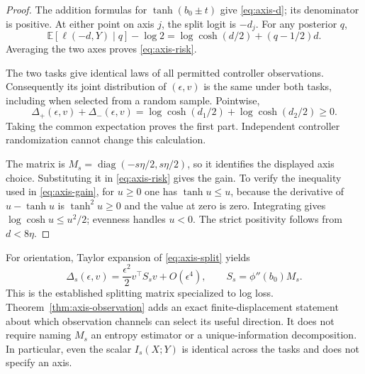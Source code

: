 \begin{proof}
The addition formulas for $\tanh(b_0\pm t)$ give
\eqref{eq:axis-d}; its denominator is positive. At either point on
axis $j$, the split logit is $-d_j$. For any posterior $q$,
\[
 \mathbb E[\ell(-d,Y)\mid q]-\log2
 =\log\cosh(d/2)+(q-1/2)d.
\]
Averaging the two axes proves \eqref{eq:axis-risk}.

The two tasks give identical laws of all permitted controller
observations. Consequently its joint distribution of $(\epsilon,v)$
is the same under both tasks, including when selected from a random
sample. Pointwise,
\[
 \Delta_+(\epsilon,v)+\Delta_-(\epsilon,v)
 =\log\cosh(d_1/2)+\log\cosh(d_2/2)\ge0.
\]
Taking the common expectation proves the first part. Independent
controller randomization cannot change this calculation.

The matrix is $M_s=\operatorname{diag}(-s\eta/2,s\eta/2)$, so it
identifies the displayed axis choice. Substituting it in
\eqref{eq:axis-risk} gives the gain. To verify the inequality used
in \eqref{eq:axis-gain}, for $u\ge0$ one has $\tanh u\le u$, because
the derivative of $u-\tanh u$ is $\tanh^2u\ge0$ and the value at zero
is zero. Integrating gives $\log\cosh u\le u^2/2$; evenness handles
$u<0$. The strict positivity follows from $d<8\eta$.
\end{proof}

For orientation, Taylor expansion of \eqref{eq:axis-split} yields
\[
 \Delta_s(\epsilon,v)
 =\frac{\epsilon^2}{2}v^\top S_s v+O(\epsilon^4),
 \qquad S_s=\phi''(b_0)M_s.
\]
This is the established splitting matrix specialized to log loss.
Theorem~\ref{thm:axis-observation} adds an exact finite-displacement
statement about which observation channels can select its useful
direction. It does not require naming $M_s$ an entropy estimator or a
unique-information decomposition. In particular, even the scalar
$I_s(X;Y)$ is identical across the tasks and does not specify an axis.

